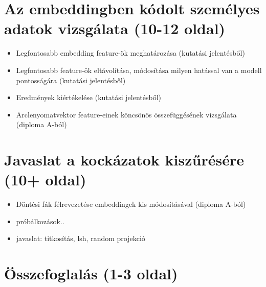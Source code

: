 \section{Az embeddingben kódolt személyes adatok vizsgálata (10-12 oldal)}
\begin{itemize}
	\item Legfontosabb embedding feature-ök meghatározása (kutatási jelentésből)
	\item Legfontosabb feature-ök eltávolítása, módosítása milyen hatással van a modell pontosságára (kutatási jelentésből) 
	\item Eredmények kiértékelése (kutatási jelentésből) 
	\item Arclenyomatvektor feature-einek köncsönös összefüggésének vizsgálata (diploma A-ból)
\end{itemize}


\section{Javaslat a kockázatok kiszűrésére (10+ oldal)}
\begin{itemize}
	\item Döntési fák félrevezetése embeddingek kis módosításával (diploma A-ból)
	\item próbálkozások.. 
	\item javaslat: titkosítás, lsh, random projekció
\end{itemize}

\section{Összefoglalás (1-3 oldal)}
